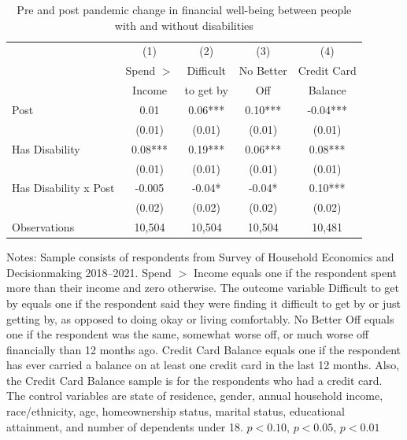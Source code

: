 \documentclass[12pt]{article}
\begin{document}
\begin{table}
\begin{minipage}{0.85\textwidth}
\end{minipage}
\end{table}


\begin{table}[]
\centering
\caption{Pre and post pandemic change in financial well-being between people with and without disabilities}\label{table:shed.reg.table}
{
\def\sym#1{\ifmmode^{#1}\else\(^{#1}\)\fi}
\begin{tabular}{l*{4}{c}}
\hline\hline
                    &\multicolumn{1}{c}{(1)}&\multicolumn{1}{c}{(2)}&\multicolumn{1}{c}{(3)}&\multicolumn{1}{c}{(4)}\\
        ~ & Spend $>$ & Difficult & No Better & Credit Card \\ 
        & Income&to get by&Off&   Balance \\ \hline
        Post & 0.01  & 0.06***  & 0.10*** & -0.04***   \\ 
        & (0.01) & (0.01) & (0.01) &  (0.01)  \\ 
      Has Disability & 0.08***  & 0.19***  & 0.06***  & 0.08***   \\ 
          & (0.01) & (0.01) & (0.01) &(0.01)  \\ 
          Has Disability x Post & -0.005  & -0.04*  & -0.04* & 0.10***  \\ 
        & (0.02) &  (0.02) & (0.02) & (0.02)  \\ \hline
        Observations & 10,504 & 10,504 & 10,504 & 10,481\\ \hline\hline
    \end{tabular}%
    }
    \medskip
\begin{minipage}{0.85\textwidth} 
{\footnotesize Notes: Sample  consists of respondents from Survey of Household Economics and Decisionmaking 2018--2021. Spend $>$ Income equals one if the respondent spent more than their income and zero otherwise. The outcome variable Difficult to get by equals one if the respondent said they were finding it difficult to get by or just getting by, as opposed to doing okay or living comfortably. No Better Off equals one if the respondent was the same, somewhat worse off, or much worse off financially than 12 months ago. Credit Card Balance equals one if the respondent has ever carried a balance on at least one credit card in the last 12 months. Also, the Credit Card Balance sample is for the respondents who had a credit card. The control variables are state of residence, gender, annual household income, race/ethnicity, age, homeownership status, marital status, educational attainment, and number of dependents under 18. \sym{*} \(p<0.10\), \sym{**} \(p<0.05\), \sym{***} \(p<0.01\) \par}
\end{minipage}
\end{table}
\end{document}
